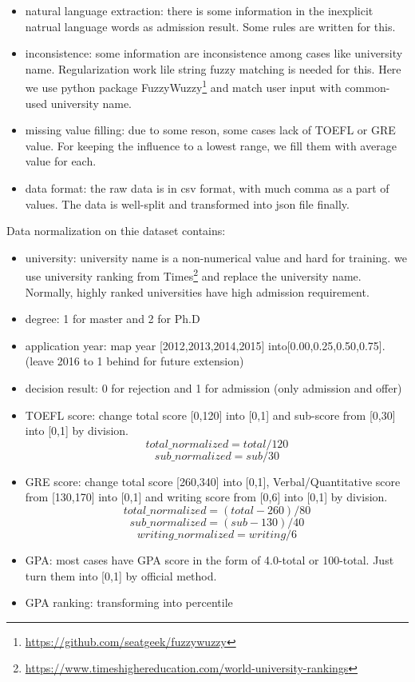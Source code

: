 \documentclass{article}
\begin{document}
\begin{itemize}
    \item natural language extraction: there is some information in the inexplicit natrual language words as admission result. Some rules are written for this.
    \item inconsistence: some information are inconsistence among cases like university name. Regularization work lile string fuzzy matching is needed for this. Here we use python package FuzzyWuzzy\footnote{\url{https://github.com/seatgeek/fuzzywuzzy}} and match user input with common-used university name.
    \item missing value filling: due to some reson, some cases lack of TOEFL or GRE value. For keeping the influence to a lowest range, we fill them with average value for each.
    \item data format: the raw data is in csv format, with much comma as a part of values. The data is well-split and transformed into json file finally.
\end{itemize}

Data normalization on thie dataset contains:

\begin{itemize}
    \item university: university name is a non-numerical value and hard for training. we use university ranking from Times\footnote{\url{https://www.timeshighereducation.com/world-university-rankings}} and replace the university name. Normally, highly ranked universities have high admission requirement.
    \item degree: 1 for master and 2 for Ph.D
    \item application year: map year [2012,2013,2014,2015] into[0.00,0.25,0.50,0.75]. (leave 2016 to 1 behind for future extension)
    \item decision result: 0 for rejection and 1 for admission (only admission and offer)
    \item TOEFL score: change total score [0,120] into [0,1] and sub-score from [0,30] into [0,1] by division.
    $$
    total\_normalized=total/120
    $$
    $$
    sub\_normalized=sub/30
    $$
    \item GRE score: change total score [260,340] into [0,1], Verbal/Quantitative score from [130,170] into [0,1] and writing score from [0,6] into [0,1] by division.
    $$
    total\_normalized=(total-260)/80
    $$
    $$
    sub\_normalized=(sub-130)/40
    $$
    $$
    writing\_normalized=writing/6
    $$
    \item GPA: most cases have GPA score in the form of 4.0-total or 100-total. Just turn them into [0,1] by official method.
    \item GPA ranking: transforming into percentile
\end{itemize}
\end{document}
